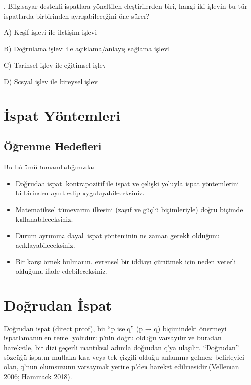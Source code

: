 \par\smallskip{}. Bilgisayar destekli ispatlara yöneltilen eleştirilerden biri, hangi iki işlevin bu tür ispatlarda birbirinden ayrışabileceğini öne sürer?

\par\noindent\hspace*{1.6em}A) Keşif işlevi ile iletişim işlevi

\par\noindent\hspace*{1.6em}B) Doğrulama işlevi ile açıklama/anlayış sağlama işlevi

\par\noindent\hspace*{1.6em}C) Tarihsel işlev ile eğitimsel işlev

\par\noindent\hspace*{1.6em}D) Sosyal işlev ile bireysel işlev


\section*{İspat Yöntemleri}
\subsection*{Öğrenme Hedefleri}

Bu bölümü tamamladığınızda:

\begin{itemize}\setlength{\itemsep}{2pt}\setlength{\parskip}{0pt}
\item Doğrudan ispat, kontrapozitif ile ispat ve çelişki yoluyla ispat yöntemlerini birbirinden ayırt edip uygulayabileceksiniz.
\item Matematiksel tümevarım ilkesini (zayıf ve güçlü biçimleriyle) doğru biçimde kullanabileceksiniz.
\item Durum ayrımına dayalı ispat yönteminin ne zaman gerekli olduğunu açıklayabileceksiniz.
\item Bir karşı örnek bulmanın, evrensel bir iddiayı çürütmek için neden yeterli olduğunu ifade edebileceksiniz.
\end{itemize}

\section{Doğrudan İspat}

Doğrudan ispat (direct proof), bir “p ise q” (p → q) biçimindeki önermeyi ispatlamanın en temel yoludur: p’nin doğru olduğu varsayılır ve buradan hareketle, bir dizi geçerli mantıksal adımla doğrudan q’ya ulaşılır. “Doğrudan” sözcüğü ispatın mutlaka kısa veya tek çizgili olduğu anlamına gelmez; belirleyici olan, q’nun olumsuzunu varsaymak yerine p’den hareket edilmesidir (Velleman 2006; Hammack 2018).


